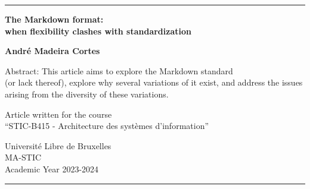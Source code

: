 \begin{titlepage}
	\center

	\rule{\linewidth}{1pt} %

	\vspace{2cm}

	\Large \textbf{
		The Markdown format: \\ \vspace{0.2cm} when flexibility clashes with standardization
	}

	\vspace{2cm}

	\large \textbf{ André Madeira Cortes }

	\vspace{3cm}

	Abstract: This article aims to explore the Markdown standard \\ (or lack thereof), explore why several variations of it exist,
	and address the issues arising from the diversity of these variations.

	\vspace{3cm}

	Article written for the course \\ ``STIC-B415 - Architecture des systèmes d'information'' \\

	\vspace{0.8cm}

	Université Libre de Bruxelles\\
	MA-STIC \\
	Academic Year 2023-2024

	\rule{\linewidth}{1pt} %
\end{titlepage}